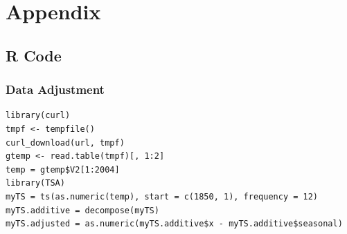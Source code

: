 \documentclass[a4paper,11pt]{article}
\begin{document}
\newpage
\section{Appendix}

\subsection{R Code}
\subsubsection{Data Adjustment}
\begin{verbatim}
library(curl)
tmpf <- tempfile()
curl_download(url, tmpf)
gtemp <- read.table(tmpf)[, 1:2]
temp = gtemp$V2[1:2004]
library(TSA)
myTS = ts(as.numeric(temp), start = c(1850, 1), frequency = 12)
myTS.additive = decompose(myTS)
myTS.adjusted = as.numeric(myTS.additive$x - myTS.additive$seasonal)
\end{verbatim}
\end{document}
